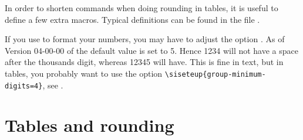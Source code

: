 \documentclass[UKenglish,texlive=2016]{\ATLASLATEXPATH atlasdoc}
\begin{document}
In order to shorten commands when doing rounding in tables, it is useful to define a few extra macros.
Typical definitions can be found in the file .

If you use  to format your numbers,
you may have to adjust the option .
As of Version 04-00-00 of  the default value is set to 5.
Hence \num{1234} will not have a space after the thousands digit,
whereas \num{12345} will have.
This is fine in text, but in tables, you probably want to use the option
\verb|\siseteup{group-minimum-digits=4}|, see \Tabs{\ref{tab:minimum-digits1}}{\ref{tab:minimum-digits2}}.

\begin{table}[htbp]
  \caption{Tables comparing different  values
  for the package .}
  \label{tab:minimum-digits}
  \centering
  \qquad
\end{table}


\section{Tables and rounding}
\end{document}
